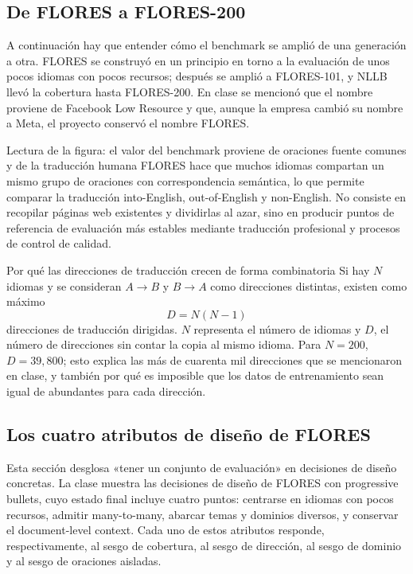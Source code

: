 \subsection{De FLORES a FLORES-200}

A continuación hay que entender cómo el benchmark se amplió de una generación a otra. FLORES se construyó en un principio en torno a la evaluación de unos pocos idiomas con pocos recursos; después se amplió a FLORES-101, y NLLB llevó la cobertura hasta FLORES-200. En clase se mencionó que el nombre proviene de Facebook Low Resource y que, aunque la empresa cambió su nombre a Meta, el proyecto conservó el nombre FLORES.


\begin{knowledgebox}{Lectura de la figura: el valor del benchmark proviene de oraciones fuente comunes y de la traducción humana}
FLORES hace que muchos idiomas compartan un mismo grupo de oraciones con correspondencia semántica, lo que permite comparar la traducción into-English, out-of-English y non-English. No consiste en recopilar páginas web existentes y dividirlas al azar, sino en producir puntos de referencia de evaluación más estables mediante traducción profesional y procesos de control de calidad.
\end{knowledgebox}

\begin{importantbox}{Por qué las direcciones de traducción crecen de forma combinatoria}
Si hay $N$ idiomas y se consideran $A\rightarrow B$ y $B\rightarrow A$ como direcciones distintas, existen como máximo
\[
D=N(N-1)
\]
direcciones de traducción dirigidas. $N$ representa el número de idiomas y $D$, el número de direcciones sin contar la copia al mismo idioma. Para $N=200$, $D=39{,}800$; esto explica las más de cuarenta mil direcciones que se mencionaron en clase, y también por qué es imposible que los datos de entrenamiento sean igual de abundantes para cada dirección.
\end{importantbox}

\subsection{Los cuatro atributos de diseño de FLORES}

Esta sección desglosa «tener un conjunto de evaluación» en decisiones de diseño concretas. La clase muestra las decisiones de diseño de FLORES con progressive bullets, cuyo estado final incluye cuatro puntos: centrarse en idiomas con pocos recursos, admitir many-to-many, abarcar temas y dominios diversos, y conservar el document-level context. Cada uno de estos atributos responde, respectivamente, al sesgo de cobertura, al sesgo de dirección, al sesgo de dominio y al sesgo de oraciones aisladas.

